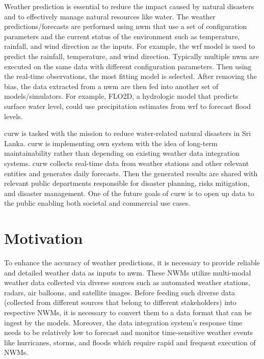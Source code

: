 Weather prediction is essential to reduce the impact caused by natural disasters and to effectively manage natural resources like water. 
The weather predictions/forecasts are performed using \acrfull{nwm} that use a set of configuration parameters and the current status of the environment such as temperature, rainfall, and wind direction as the inputs. For example, the \acrfull{wrf} \cite{MesoscaleMicroscaleMeteorologyLaboratoryWeatherModel} model is used to predict the rainfall, temperature, and wind direction. Typically multiple \acrshort{nwm} are executed on the same data with different configuration parameters. Then using the real-time observations, the most fitting model is selected. After removing the bias, the data extracted from a \acrshort{nwm} are then fed into another set of models/simulators. For example, FLO2D, a hydrologic model that predicts surface water level, could use precipitation estimates from \acrshort{wrf} to forecast flood levels.

\acrfull{curw} \cite{CUrWSL2017SL} is tasked with the mission to reduce water-related natural disasters in Sri Lanka. \acrshort{curw} \cite{CUrWSLObservedSL} is implementing own system with the idea of long-term maintainability rather than depending on existing weather data integration systems. \acrshort{curw} collects real-time data from weather stations and other relevant entities and generates daily forecasts. Then the generated results are shared with relevant public departments responsible for disaster planning, risks mitigation, and disaster management. One of the future goals of \acrshort{curw} is to open up data to the public enabling both societal and commercial use cases.

\section{Motivation}
To enhance the accuracy of weather predictions, it is necessary to provide reliable and detailed weather data as inputs to \acrshort{nwm}. These NWMs utilize multi-modal weather data collected via diverse sources such as automated weather stations, radars, air balloons, and satellite images. Before feeding such diverse data (collected from different sources that belong to different stakeholders) into respective NWMs, it is necessary to convert them to a data format that can be ingest by the models. Moreover, the data integration system's response time needs to be relatively low to forecast and monitor time-sensitive weather events like hurricanes, storms, and floods which require rapid and frequent execution of NWMs.

